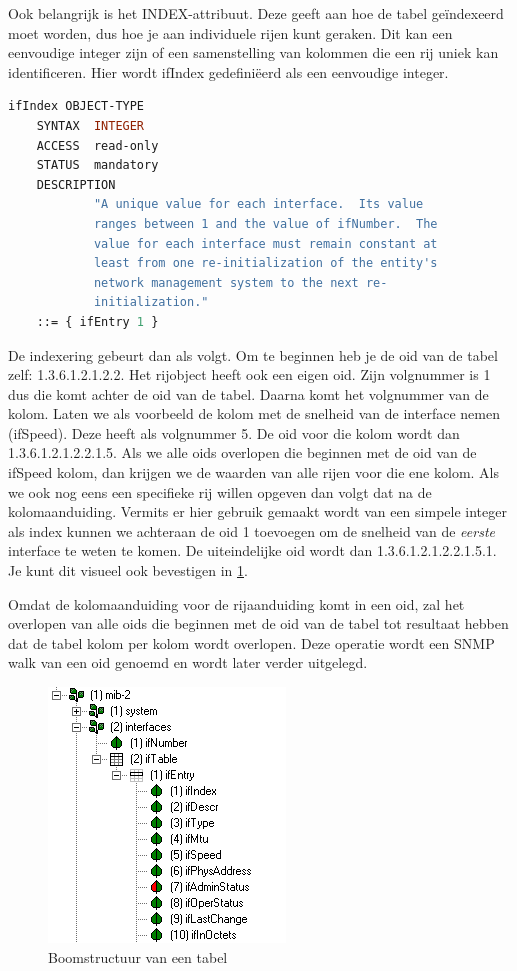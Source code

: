 Ook belangrijk is het INDEX-attribuut. Deze geeft aan hoe de tabel geïndexeerd moet worden, dus hoe je aan individuele rijen kunt geraken.
Dit kan een eenvoudige integer zijn of een samenstelling van kolommen die een rij uniek kan identificeren.
Hier wordt ifIndex gedefiniëerd als een eenvoudige integer.

\begin{lstlisting}[language=asn.1, float=h, caption={Definitie van ifIndex}, label=definitie-ifindex]
ifIndex OBJECT-TYPE
	SYNTAX	INTEGER
	ACCESS	read-only
	STATUS	mandatory
	DESCRIPTION
			"A unique value for each interface.  Its value
			ranges between 1 and the value of ifNumber.  The
			value for each interface must remain constant at
			least from one re-initialization of the entity's
			network management system to the next re-
			initialization."
	::= { ifEntry 1 }
\end{lstlisting}

De indexering gebeurt dan als volgt. Om te beginnen heb je de \gls{oid} van de tabel zelf: 1.3.6.1.2.1.2.2.
Het rijobject heeft ook een eigen \gls{oid}. Zijn volgnummer is 1 dus die komt achter de \gls{oid} van de tabel.
Daarna komt het volgnummer van de kolom. Laten we als voorbeeld de kolom met de snelheid van de interface nemen (ifSpeed).
Deze heeft als volgnummer 5. De \gls{oid} voor die kolom wordt dan 1.3.6.1.2.1.2.2.1.5.
Als we alle \glspl{oid} overlopen die beginnen met de \gls{oid} van de ifSpeed kolom, dan krijgen we de waarden van alle rijen voor die ene kolom.
Als we ook nog eens een specifieke rij willen opgeven dan volgt dat na de kolomaanduiding.
Vermits er hier gebruik gemaakt wordt van een simpele integer als index kunnen we achteraan de \gls{oid} 1 toevoegen om 
de snelheid van de \emph{eerste} interface te weten te komen. De uiteindelijke \gls{oid} wordt dan 1.3.6.1.2.1.2.2.1.5.1.
Je kunt dit visueel ook bevestigen in \figurenamesentence{} \ref{boomstructuur-tabel}.

Omdat de kolomaanduiding voor de rijaanduiding komt in een \gls{oid},
zal het overlopen van alle \glspl{oid} die beginnen met de \gls{oid} van de tabel tot resultaat hebben dat de tabel kolom per kolom wordt overlopen.
Deze operatie wordt een SNMP walk van een \gls{oid} genoemd en wordt later verder uitgelegd.

\begin{figure}[h]
	\centering
	\includegraphics[resolution=110]{figures/snmp/ifTable-cropped}
	\caption{Boomstructuur van een tabel}
	\label{boomstructuur-tabel}
\end{figure}


